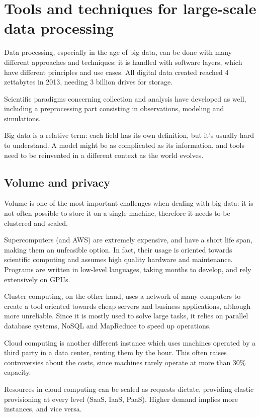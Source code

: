 \section{Tools and techniques for large-scale data processing}
Data processing, especially in the age of big data, can be done with many different approaches and techniques: it is handled with software layers, which have different principles and use cases. All digital data created reached 4 zettabytes in 2013, needing 3 billion drives for storage.

Scientific paradigms concerning collection and analysis have developed as well, including a preprocessing part consisting in observations, modeling and simulations.

Big data is a relative term: each field has its own definition, but it's usually hard to understand. A model might be as complicated as its information, and tools need to be reinvented in a different context as the world evolves.

\subsection{Volume and privacy}
Volume is one of the most important challenges when dealing with big data: it is not often possible to store it on a single machine, therefore it needs to be clustered and scaled. 

Supercomputers (and AWS) are extremely expensive, and have a short life span, making them an unfeasible option. In fact, their usage is oriented towards scientific computing and assumes high quality hardware and maintenance. Programs are written in low-level languages, taking months to develop, and rely extensively on GPUs.

Cluster computing, on the other hand, uses a network of many computers to create a tool oriented towards cheap servers and business applications, although more unreliable. Since it is mostly used to solve large tasks, it relies on parallel database systems, NoSQL and MapReduce to speed up operations. 

Cloud computing is another different instance which uses machines operated by a third party in a data center, renting them by the hour. This often raises controversies about the costs, since machines rarely operate at more than 30\% capacity.

Resources in cloud computing can be scaled as requests dictate, providing elastic provisioning at every level (SaaS, IaaS, PaaS). Higher demand implies more instances, and vice versa.

